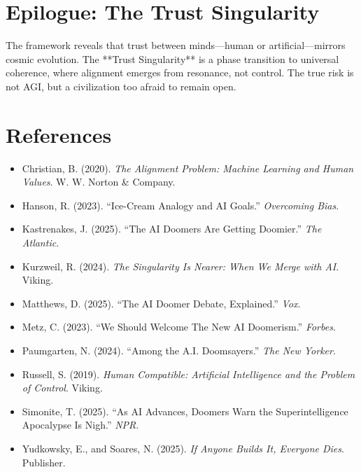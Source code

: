 \documentclass[11pt,a4paper]{article}
\DeclareMathOperator*{\RSVP}{RSVP}
\theoremstyle{definition}
\theoremstyle{plain}
\begin{document}
\section*{Epilogue: The Trust Singularity}

The \RSVP{} framework reveals that trust between minds—human or artificial—mirrors cosmic evolution. The **Trust Singularity** is a phase transition to universal coherence, where alignment emerges from resonance, not control. The true risk is not AGI, but a civilization too afraid to remain open.

\section*{References}

\begin{itemize}
\item Christian, B. (2020). \textit{The Alignment Problem: Machine Learning and Human Values}. W. W. Norton \& Company.
\item Hanson, R. (2023). ``Ice-Cream Analogy and AI Goals.'' \textit{Overcoming Bias}.
\item Kastrenakes, J. (2025). ``The AI Doomers Are Getting Doomier.'' \textit{The Atlantic}.
\item Kurzweil, R. (2024). \textit{The Singularity Is Nearer: When We Merge with AI}. Viking.
\item Matthews, D. (2025). ``The AI Doomer Debate, Explained.'' \textit{Vox}.
\item Metz, C. (2023). ``We Should Welcome The New AI Doomerism.'' \textit{Forbes}.
\item Paumgarten, N. (2024). ``Among the A.I. Doomsayers.'' \textit{The New Yorker}.
\item Russell, S. (2019). \textit{Human Compatible: Artificial Intelligence and the Problem of Control}. Viking.
\item Simonite, T. (2025). ``As AI Advances, Doomers Warn the Superintelligence Apocalypse Is Nigh.'' \textit{NPR}.
\item Yudkowsky, E., and Soares, N. (2025). \textit{If Anyone Builds It, Everyone Dies}. Publisher.
\end{itemize}
\end{document}
